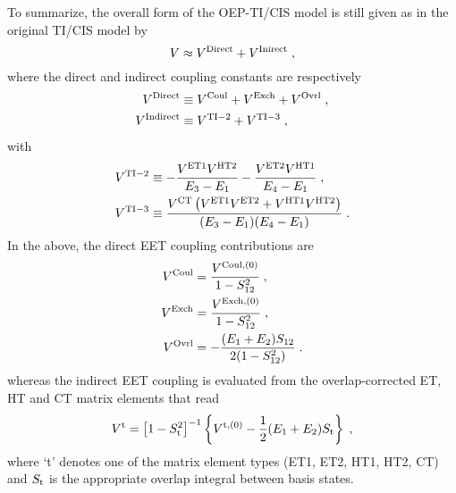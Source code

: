 To summarize, the overall form of the OEP-TI/CIS model is still given as in the original TI/CIS model
by
%
\begin{equation}
  V \approx V^{\rm Direct} + V^{\rm Inirect} \;,
\end{equation}
%
where the direct and indirect coupling constants are respectively
%
\begin{subequations}
\begin{align}
  V^{\rm Direct  } &\equiv V^{\rm Coul} + V^{\rm Exch} + V^{\rm Ovrl} \;,\\
  V^{\rm Indirect} &\equiv V^{\rm TI-2} + V^{\rm TI-3} \;,
\end{align}
\end{subequations}
%
with
%
\begin{subequations}
\begin{align}
 V^{\rm TI-2} &\equiv-\frac{V^{\rm ET1} V^{\rm HT2}}{E_3-E_1} -\frac{V^{\rm ET2} V^{\rm HT1}}{E_4-E_1}  \;,\\
 V^{\rm TI-3} &\equiv \frac{V^{\rm CT} \left( V^{\rm ET1} V^{\rm ET2} + V^{\rm HT1} V^{\rm HT2}\right) }{(E_3-E_1)(E_4-E_1)} \;.
\end{align}
\end{subequations}
%
In the above, the direct EET coupling contributions are
%
\begin{subequations}\label{e:ovrl-direct}
\begin{align}
 V^{\rm Coul} &= \frac{V^{{\rm Coul},(0)}}{1 - S_{12}^2} \;, \\
 V^{\rm Exch} &= \frac{V^{{\rm Exch},(0)}}{1 - S_{12}^2} \;, \\
 V^{\rm Ovrl} &=-\frac{(E_1+E_2)S_{12}}{2(1-S_{12}^2)}   \;.
\end{align}
\end{subequations}
%
whereas the indirect EET coupling is evaluated from
the overlap\hyp{}corrected ET, HT and CT matrix elements that read
%
\begin{equation}\label{e:ovrl-indirect}
 V^{\rm t} = \left[ 1 - S_{\rm t}^2 \right]^{-1} \left\{ V^{{\rm t},(0)} - \frac{1}{2} (E_1+E_2) S_{\rm t} \right\} \;,
\end{equation}
%
where `t' denotes one of the matrix element types (ET1, ET2, HT1, HT2, CT) 
and $S_{\rm t}$ is the appropriate overlap integral between basis states.

